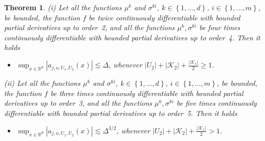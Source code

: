 \documentclass[11pt,a4paper]{amsart}
\theoremstyle{plain}
\newtheorem{theorem}{Theorem}[section]
\theoremstyle{definition}
\theoremstyle{remark}
\numberwithin{equation}{section}
\newcommand*{\R}{\mathbb{R}}
\begin{document}
\begin{theorem}
\label{th:second_new}
(i)
Let all the functions $\mu^k$ and $\sigma^{ki}$, $k\in\left\{1,\ldots,d\right\}$, $i\in\left\{1,\ldots,m\right\}$, be bounded,
the function $f$ be twice continuously differentiable
with bounded partial derivatives up to order~2,
and all the functions $\mu^k,\sigma^{ki}$ be four times continuously differentiable with bounded partial derivatives up to order~4. Then it holds
\begin{itemize}
\item[(B3)] $\sup_{x\in\R^d} |a_{j,o,U_1,U_2}(x)|\lesssim\Delta$, whenever $\left|U_2\right|+\left|\mathcal{K}_2\right|+\frac{\left|\mathcal{K}_1\right|}{2}\ge 1$.
\end{itemize}

(ii)
Let all the functions $\mu^k$ and $\sigma^{ki}$, $k\in\left\{1,\ldots,d\right\}$, $i\in\left\{1,\ldots,m\right\}$, be bounded,
the function $f$ be three times continuously differentiable
with bounded partial derivatives up to order~3,
and all the functions $\mu^k,\sigma^{ki}$ be five times continuously differentiable with bounded partial derivatives up to order~5. Then it holds
\begin{itemize}
\item[(B4)] $\sup_{x\in\R^d} |a_{j,o,U_1,U_2}(x)|\lesssim\Delta^{3/2}$, whenever $\left|U_2\right|+\left|\mathcal{K}_2\right|+\frac{\left|\mathcal{K}_1\right|}{2}>1$.
\end{itemize}
\end{theorem}
\end{document}
